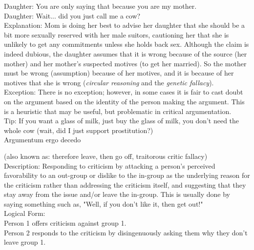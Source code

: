 \documentclass[a4paper,12pt,single,pdftex]{scrbook}
\begin{document}
    
      Daughter: You are only saying that because you are my mother.
    \\

    
      Daughter: Wait... did you just call me a cow?
    \\

    
      Explanation: Mom is doing her best to advise her daughter that she should be a bit more sexually reserved with her male suitors, cautioning her that she is unlikely to get any commitments unless she holds back sex. Although the claim is indeed dubious, the daughter assumes that it is wrong because of the source (her mother) and her mother's suspected motives (to get her married). So the mother must be wrong (assumption) because of her motives, and it is because of her motives that she is wrong ({\it circular reasoning} and the {\it genetic fallacy}).
    \\

    
      Exception: There is no exception; however, in some cases it is fair to cast doubt on the argument based on the identity of the person making the argument. This is a heuristic that may be useful, but problematic in critical argumentation.
    \\

    
      Tip: If you want a glass of milk, just buy the glass of milk, you don't need the whole cow (wait, did I just support prostitution?)
    \\

  

Argumentum ergo decedo
    
      (also known as: therefore leave, then go off, traitorous critic fallacy)
    \\

  
    
      Description: Responding to criticism by attacking a person's perceived favorability to an out-group or dislike to the in-group as the underlying reason for the criticism rather than addressing the criticism itself, and suggesting that they stay away from the issue and/or leave the in-group. This is usually done by saying something such as, "Well, if you don't like it, then get out!"
    \\

    
      Logical Form:
    \\

    
      Person 1 offers criticism against group 1.
    \\

    
      Person 2 responds to the criticism by disingenuously asking them why they don't leave group 1.
    \\
\end{document}
